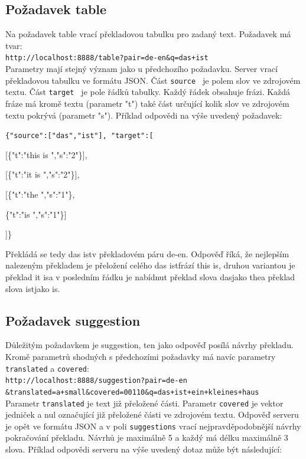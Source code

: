 \documentclass[12pt,a4paper]{report}
\begin{document}
\subsection{Požadavek table}
Na požadavek table vrací překladovou tabulku pro zadaný text. Požadavek má tvar: \\

{\tt http://localhost:8888/table?pair=de-en\&q=das+ist } \\

Parametry mají stejný význam jako u předchozího požadavku. Server vrací překladovou tabulku ve formátu JSON. Část {\tt source } je polem slov ve zdrojovém textu. Část {\tt target } je pole řádků tabulky. Každý řádek obsahuje frázi. Každá fráze má kromě textu (parametr "t") také část určující kolik slov ve zdrojovém textu pokrývá (parametr "s"). Příklad odpovědi na výše uvedený požadavek: \\

{\tt \{"source":["das","ist"],
"target":[ 

[\{"t":"this is ","s":"2"\}],
 
[\{"t":"it is ","s":"2"\}],
 
[\{"t":"the ","s":"1"\},

\{"t":"is ","s":"1"\}]

]\} 

}

Překládá se tedy \clqq das ist\crqq  v překladovém páru \clqq de-en\crqq . Odpověď říká, že nejlepším nalezeným překladem je přeložení celého \clqq das ist\crqq  frází \clqq this is\crqq , druhou variantou je překlad \clqq it is\crqq  a v posledním řádku je nabídnut překlad slova \clqq das\crqq  jako \clqq the\crqq  a překlad slova \clqq ist\crqq  jako \crqq is\crqq .

\subsection{Požadavek suggestion}
Důležitým požadavkem je suggestion, ten jako odpověď posílá návrhy překladu. Kromě parametrů shodných s předchozími požadavky má navíc parametry {\tt translated} a {\tt covered}: \\

{\tt http://localhost:8888/suggestion?pair=de-en \\ \&translated=a+small\&covered=00110\&q=das+ist+ein+kleines+haus } \\

Parametr {\tt translated} je text již přeložené části. Parametr {\tt covered} je vektor jedniček a nul označující již přeložené části ve zdrojovém textu. Odpověď serveru je opět ve formátu JSON a v poli {\tt suggestions} vrací nejpravděpodobnější návrhy pokračování překladu. Návrhů je maximálně 5 a každý má délku maximálně 3 slova. Příklad odpovědi serveru na výše uvedený dotaz může být následující: \\
\end{document}
